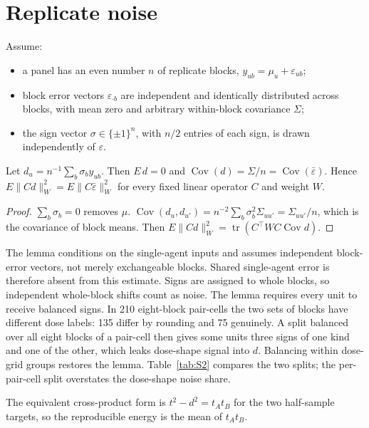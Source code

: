 \documentclass[11pt]{article}
\begin{document}
\section{Replicate noise}\label{sec:S3}
\setcounter{proposition}{3}
\begin{lemma}\label{lem:noise}
Assume:
\begin{itemize}
\item a panel has an even number $n$ of replicate blocks, $y_{ub}=\mu_u+\varepsilon_{ub}$;
\item block error vectors $\varepsilon_{\cdot b}$ are independent and identically distributed across blocks, with mean zero and arbitrary within-block covariance $\Sigma$;
\item the sign vector $\sigma\in\{\pm1\}^n$, with $n/2$ entries of each sign, is drawn independently of $\varepsilon$.
\end{itemize}
Let $d_u=n^{-1}\sum_b\sigma_by_{ub}$. Then $E\,d=0$ and $\operatorname{Cov}(d)=\Sigma/n=\operatorname{Cov}(\bar\varepsilon)$. Hence $E\|Cd\|_W^2=E\|C\bar\varepsilon\|_W^2$ for every fixed linear operator $C$ and weight $W$.
\end{lemma}
\begin{proof}
$\sum_b\sigma_b=0$ removes $\mu$. $\operatorname{Cov}(d_u,d_{u'})=n^{-2}\sum_b\sigma_b^2\Sigma_{uu'}=\Sigma_{uu'}/n$, which is the covariance of block means. Then $E\|Cd\|_W^2=\operatorname{tr}(C^\top WC\operatorname{Cov}d)$.
\end{proof}

The lemma conditions on the single-agent inputs and assumes independent block-error vectors, not merely exchangeable blocks. Shared single-agent error is therefore absent from this estimate. Signs are assigned to whole blocks, so independent whole-block shifts count as noise. The lemma requires every unit to receive balanced signs. In 210 eight-block pair-cells the two sets of blocks have different dose labels: 135 differ by rounding and 75 genuinely. A split balanced over all eight blocks of a pair-cell then gives some units three signs of one kind and one of the other, which leaks dose-shape signal into $d$. Balancing within dose-grid groups restores the lemma. Table~\ref{tab:S2} compares the two splits; the per-pair-cell split overstates the dose-shape noise share.

The equivalent cross-product form is $t^2-d^2=t_At_B$ for the two half-sample targets, so the reproducible energy is the mean of $t_At_B$.
\end{document}
